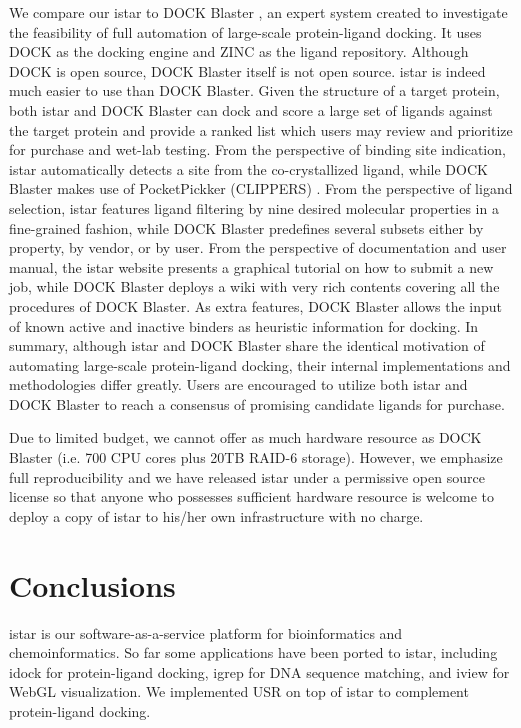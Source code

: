 We compare our istar to DOCK Blaster \citep{557}, an expert system created to investigate the feasibility of full automation of large-scale protein-ligand docking. It uses DOCK \citep{1222} as the docking engine and ZINC \citep{532,1178} as the ligand repository. Although DOCK is open source, DOCK Blaster itself is not open source. istar is indeed much easier to use than DOCK Blaster. Given the structure of a target protein, both istar and DOCK Blaster can dock and score a large set of ligands against the target protein and provide a ranked list which users may review and prioritize for purchase and wet-lab testing. From the perspective of binding site indication, istar automatically detects a site from the co-crystallized ligand, while DOCK Blaster makes use of PocketPickker (CLIPPERS) \citep{395}. From the perspective of ligand selection, istar features ligand filtering by nine desired molecular properties in a fine-grained fashion, while DOCK Blaster predefines several subsets either by property, by vendor, or by user. From the perspective of documentation and user manual, the istar website presents a graphical tutorial on how to submit a new job, while DOCK Blaster deploys a wiki with very rich contents covering all the procedures of DOCK Blaster. As extra features, DOCK Blaster allows the input of known active and inactive binders as heuristic information for docking. In summary, although istar and DOCK Blaster share the identical motivation of automating large-scale protein-ligand docking, their internal implementations and methodologies differ greatly. Users are encouraged to utilize both istar and DOCK Blaster to reach a consensus of promising candidate ligands for purchase.

Due to limited budget, we cannot offer as much hardware resource as DOCK Blaster (i.e. 700 CPU cores plus 20TB RAID-6 storage). However, we emphasize full reproducibility and we have released istar under a permissive open source license so that anyone who possesses sufficient hardware resource is welcome to deploy a copy of istar to his/her own infrastructure with no charge.

\section{Conclusions}

istar \citep{1362} is our software-as-a-service platform for bioinformatics and chemoinformatics. So far some applications have been ported to istar, including idock \citep{1153} for protein-ligand docking, igrep \citep{1138} for DNA sequence matching, and iview \citep{1366} for WebGL visualization. We implemented USR on top of istar to complement protein-ligand docking.

